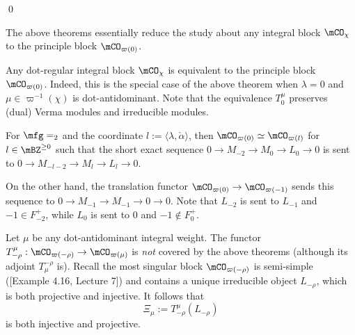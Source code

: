 	\qed


	\begin{rem}
		The above theorems essentially reduce the study about any integral block $\mCO_\chi$ to the principle block $\mCO_{\varpi(0)}$.
	\end{rem}

	\begin{exam}
		Any dot-regular integral block $\mCO_\chi$ is equivalent to the principle block $\mCO_{\varpi(0)}$. Indeed, this is the special case of the above theorem when $\lambda=0$ and $\mu\in \varpi^{-1}(\chi)$ is dot-antidominant. Note that the equivalence $T_0^\mu$ preserves (dual) Verma modules and irreducible modules. 
	\end{exam}

	\begin{exam}
		For $\mfg=\sl_2$ and the coordinate $l:=\langle \lambda, \check \alpha \rangle$, then $\mCO_{\varpi(0)} \simeq \mCO_{\varpi(l)}$ for $l\in \mBZ^{\ge 0}$ such that the short exact sequence $0\to M_{-2} \to M_0 \to L_0 \to 0$ is sent to $0\to M_{-l-2} \to M_l \to L_l \to 0$. 

		On the other hand, the translation functor $\mCO_{\varpi(0)} \to \mCO_{\varpi(-1)}$ sends this sequence to $0 \to M_{-1} \to M_{-1} \to 0 \to 0$. Note that $L_{-2}$ is sent to $L_{-1}$ and $-1 \in F_{-2}^+$, while $L_{0}$ is sent to $0$ and $-1 \notin F_{0}^+$.
	\end{exam}


	\begin{constr}
		Let $\mu$ be any dot-antidominant integral weight. The functor $T_{-\rho}^\mu:\mCO_{\varpi(-\rho)} \to \mCO_{\varpi(\mu)}$ is \emph{not} covered by the above theorems (although its adjoint $T_\mu^{-\rho}$ is). Recall the most singular block $\mCO_{\varpi(-\rho)}$ is semi-simple ([Example 4.16, Lecture 7]) and contains a unique irreducible object $L_{-\rho}$, which is both projective and injective. It follows that 
		\[
			\Xi_{\mu}:= T_{-\rho}^\mu(L_{-\rho})
		\]
		is both injective and projective.
	\end{constr}

